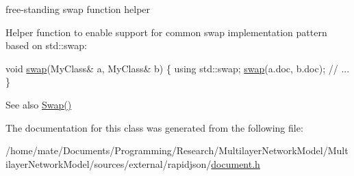 free-\/standing swap function helper 

Helper function to enable support for common swap implementation pattern based on {\ttfamily std\+::swap\+:} 
\begin{DoxyCode}
\textcolor{keywordtype}{void} \hyperlink{classGenericDocument_a0d63efcc43758ac3aed77e868233369d}{swap}(MyClass& a, MyClass& b) \{
    \textcolor{keyword}{using} std::swap;
    \hyperlink{classGenericDocument_a0d63efcc43758ac3aed77e868233369d}{swap}(a.doc, b.doc);
    \textcolor{comment}{// ...}
\}
\end{DoxyCode}
 \begin{DoxySeeAlso}{See also}
\hyperlink{classGenericDocument_a6290e1290fad74177625af5938c0c58f}{Swap()} 
\end{DoxySeeAlso}


The documentation for this class was generated from the following file\+:\begin{DoxyCompactItemize}
\item 
/home/mate/\+Documents/\+Programming/\+Research/\+Multilayer\+Network\+Model/\+Multilayer\+Network\+Model/sources/external/rapidjson/\hyperlink{document_8h}{document.\+h}\end{DoxyCompactItemize}
